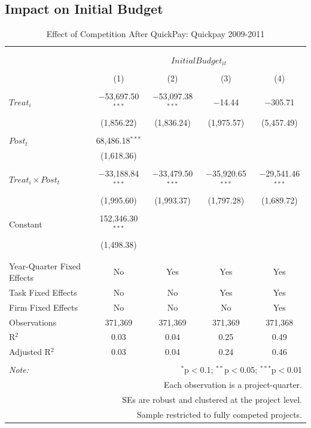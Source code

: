 \documentclass[
]{article}
\begin{document}
\hypertarget{impact-on-initial-budget}{%
\subsection{Impact on Initial Budget}\label{impact-on-initial-budget}}

\begin{table}[H] \centering 
  \caption{Effect of Competition After QuickPay: Quickpay 2009-2011} 
  \label{} 
\small 
\begin{tabular}{@{\extracolsep{-2pt}}lcccc} 
\\[-1.8ex]\hline 
\hline \\[-1.8ex] 
\\[-1.8ex] & \multicolumn{4}{c}{$InitialBudget_{it}$} \\ 
\\[-1.8ex] & (1) & (2) & (3) & (4)\\ 
\hline \\[-1.8ex] 
 $Treat_i$ & $-$53,697.50$^{***}$ & $-$53,097.38$^{***}$ & $-$14.44 & $-$305.71 \\ 
  & (1,856.22) & (1,836.24) & (1,975.57) & (5,457.49) \\ 
  & & & & \\ 
 $Post_t$ & 68,486.18$^{***}$ &  &  &  \\ 
  & (1,618.36) &  &  &  \\ 
  & & & & \\ 
 $Treat_i \times Post_t$ & $-$33,188.84$^{***}$ & $-$33,479.50$^{***}$ & $-$35,920.65$^{***}$ & $-$29,541.46$^{***}$ \\ 
  & (1,995.60) & (1,993.37) & (1,797.28) & (1,689.72) \\ 
  & & & & \\ 
 Constant & 152,346.30$^{***}$ &  &  &  \\ 
  & (1,498.38) &  &  &  \\ 
  & & & & \\ 
\hline \\[-1.8ex] 
Year-Quarter Fixed Effects & No & Yes & Yes & Yes \\ 
Task Fixed Effects & No & No & Yes & Yes \\ 
Firm Fixed Effects & No & No & No & Yes \\ 
Observations & 371,369 & 371,369 & 371,369 & 371,368 \\ 
R$^{2}$ & 0.03 & 0.04 & 0.25 & 0.49 \\ 
Adjusted R$^{2}$ & 0.03 & 0.04 & 0.24 & 0.46 \\ 
\hline 
\hline \\[-1.8ex] 
\textit{Note:}  & \multicolumn{4}{r}{$^{*}$p$<$0.1; $^{**}$p$<$0.05; $^{***}$p$<$0.01} \\ 
 & \multicolumn{4}{r}{Each observation is a project-quarter.} \\ 
 & \multicolumn{4}{r}{SEs are robust and clustered at the project level.} \\ 
 & \multicolumn{4}{r}{Sample restricted to fully competed projects.} \\ 
\end{tabular} 
\end{table}
\end{document}
